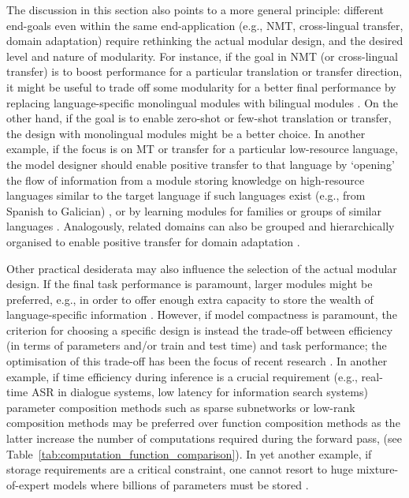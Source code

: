 The discussion in this section also points to a more general principle: different end-goals even within the same end-application (e.g., NMT, cross-lingual transfer, domain adaptation) require rethinking the actual modular design, and the desired level and nature of modularity. For instance, if the goal in NMT (or cross-lingual transfer) is to boost performance for a particular translation or transfer direction, it might be useful to trade off some modularity for a better final performance by replacing language-specific monolingual modules with bilingual modules \citep{Bapna2019Adapters,Parovic2022BADX}. On the other hand, if the goal is to enable zero-shot or few-shot translation or transfer, the design with monolingual modules might be a better choice. In another example, if the focus is on MT or transfer for a particular low-resource language, the model designer should enable positive transfer to that language by `opening' the flow of information from a module storing knowledge on high-resource languages similar to the target language if such languages exist (e.g., from Spanish to Galician) \citep{ustun-etal-2021-multilingual}, or by learning modules for families or groups of similar languages \citep{Chronopolou:2022arxiv,Faisal:2022arxiv}. Analogously, related domains can also be grouped and hierarchically organised to enable positive transfer for domain adaptation \citep{Chronopoulou2022EfficientHierarchical}.

Other practical desiderata may also influence the selection of the actual modular design. If the final task performance is paramount, larger modules might be preferred, e.g., in order to offer enough extra capacity to store the wealth of language-specific information \citep{ansell2021composable}. However, if model compactness is paramount, the criterion for choosing a specific design is instead the trade-off between efficiency (in terms of parameters and/or train and test time) and task performance; the optimisation of this trade-off has been the focus of recent research \citep{Rueckle2021AdapterDrop,Mahabadi2021Compacter,mahabadi2021parameter,Sun:2022bbtv2}. In another example, if time efficiency during inference is a crucial requirement (e.g., real-time ASR in dialogue systems, low latency for information search systems) parameter composition methods such as sparse subnetworks or low-rank composition methods may be preferred over function composition methods as the latter increase the number of computations required during the forward pass, (see Table~\ref{tab:computation_function_comparison}). In yet another example, if storage requirements are a critical constraint, one cannot resort to huge mixture-of-expert models where billions of parameters must be stored \citep{Lepikhin2021GShard}.

